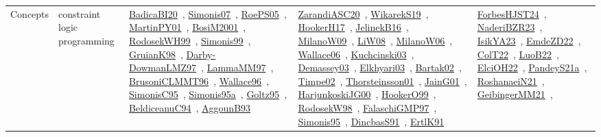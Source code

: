 {\begin{longtable}{lp{3cm}>{\raggedright\arraybackslash}p{6cm}>{\raggedright\arraybackslash}p{6cm}>{\raggedright\arraybackslash}p{8cm}}
\index{constraint logic programming}\index{Concepts!constraint logic programming}Concepts & constraint logic programming & \href{../works/BadicaBI20.pdf}{BadicaBI20}~\cite{BadicaBI20}, \href{../works/Simonis07.pdf}{Simonis07}~\cite{Simonis07}, \href{../works/RoePS05.pdf}{RoePS05}~\cite{RoePS05}, \href{../works/MartinPY01.pdf}{MartinPY01}~\cite{MartinPY01}, \href{../works/BosiM2001.pdf}{BosiM2001}~\cite{BosiM2001}, \href{../works/RodosekWH99.pdf}{RodosekWH99}~\cite{RodosekWH99}, \href{../works/Simonis99.pdf}{Simonis99}~\cite{Simonis99}, \href{../works/GruianK98.pdf}{GruianK98}~\cite{GruianK98}, \href{../works/Darby-DowmanLMZ97.pdf}{Darby-DowmanLMZ97}~\cite{Darby-DowmanLMZ97}, \href{../works/LammaMM97.pdf}{LammaMM97}~\cite{LammaMM97}, \href{../works/BrusoniCLMMT96.pdf}{BrusoniCLMMT96}~\cite{BrusoniCLMMT96}, \href{../works/Wallace96.pdf}{Wallace96}~\cite{Wallace96}, \href{../works/SimonisC95.pdf}{SimonisC95}~\cite{SimonisC95}, \href{../works/Simonis95a.pdf}{Simonis95a}~\cite{Simonis95a}, \href{../works/Goltz95.pdf}{Goltz95}~\cite{Goltz95}, \href{../works/BeldiceanuC94.pdf}{BeldiceanuC94}~\cite{BeldiceanuC94}, \href{../works/AggounB93.pdf}{AggounB93}~\cite{AggounB93} & \href{../works/ZarandiASC20.pdf}{ZarandiASC20}~\cite{ZarandiASC20}, \href{../works/WikarekS19.pdf}{WikarekS19}~\cite{WikarekS19}, \href{../works/HookerH17.pdf}{HookerH17}~\cite{HookerH17}, \href{../works/JelinekB16.pdf}{JelinekB16}~\cite{JelinekB16}, \href{../works/MilanoW09.pdf}{MilanoW09}~\cite{MilanoW09}, \href{../works/LiW08.pdf}{LiW08}~\cite{LiW08}, \href{../works/MilanoW06.pdf}{MilanoW06}~\cite{MilanoW06}, \href{../works/Wallace06.pdf}{Wallace06}~\cite{Wallace06}, \href{../works/Kuchcinski03.pdf}{Kuchcinski03}~\cite{Kuchcinski03}, \href{../works/Demassey03.pdf}{Demassey03}~\cite{Demassey03}, \href{../works/Elkhyari03.pdf}{Elkhyari03}~\cite{Elkhyari03}, \href{../works/Bartak02.pdf}{Bartak02}~\cite{Bartak02}, \href{../works/Timpe02.pdf}{Timpe02}~\cite{Timpe02}, \href{../works/Thorsteinsson01.pdf}{Thorsteinsson01}~\cite{Thorsteinsson01}, \href{../works/JainG01.pdf}{JainG01}~\cite{JainG01}, \href{../works/HarjunkoskiJG00.pdf}{HarjunkoskiJG00}~\cite{HarjunkoskiJG00}, \href{../works/HookerO99.pdf}{HookerO99}~\cite{HookerO99}, \href{../works/RodosekW98.pdf}{RodosekW98}~\cite{RodosekW98}, \href{../works/FalaschiGMP97.pdf}{FalaschiGMP97}~\cite{FalaschiGMP97}, \href{../works/Simonis95.pdf}{Simonis95}~\cite{Simonis95}, \href{../works/DincbasS91.pdf}{DincbasS91}~\cite{DincbasS91}, \href{../works/ErtlK91.pdf}{ErtlK91}~\cite{ErtlK91} & \href{../works/ForbesHJST24.pdf}{ForbesHJST24}~\cite{ForbesHJST24}, \href{../works/NaderiBZR23.pdf}{NaderiBZR23}~\cite{NaderiBZR23}, \href{../works/IsikYA23.pdf}{IsikYA23}~\cite{IsikYA23}, \href{../works/EmdeZD22.pdf}{EmdeZD22}~\cite{EmdeZD22}, \href{../works/ColT22.pdf}{ColT22}~\cite{ColT22}, \href{../works/LuoB22.pdf}{LuoB22}~\cite{LuoB22}, \href{../works/ElciOH22.pdf}{ElciOH22}~\cite{ElciOH22}, \href{../works/PandeyS21a.pdf}{PandeyS21a}~\cite{PandeyS21a}, \href{../works/RoshanaeiN21.pdf}{RoshanaeiN21}~\cite{RoshanaeiN21}, \href{../works/GeibingerMM21.pdf}{GeibingerMM21}~\cite{GeibingerMM21}, 
\end{longtable}}
